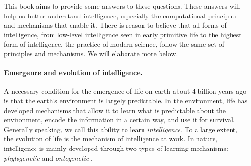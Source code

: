 \documentclass[../../book-main.tex]{subfiles}
\begin{document}
This book aims to provide some answers to these questions. These answers will help us better understand intelligence, especially the computational principles and mechanisms that enable it. There is reason to believe that all forms of intelligence, from low-level intelligence seen in early primitive life to the highest form of intelligence, the practice of modern science, follow the same set of principles and mechanisms. We will elaborate more below.

\paragraph{Emergence and evolution of intelligence.}

A necessary condition for the emergence of life on earth about 4 billion years ago is that the earth's environment is largely predictable. In the environment, life has developed mechanisms that allow it to learn what is predictable about the environment, encode the information in a certain way, and use it for survival. Generally speaking, we call this ability to learn {\em intelligence}. To a large extent, the evolution of life is the mechanism of intelligence at work. In nature, intelligence is mainly developed through two types of learning mechanisms: {\em phylogenetic} and {\em ontogenetic} \cite{Wiener-Cybernetics-1961}.%
\end{document}
